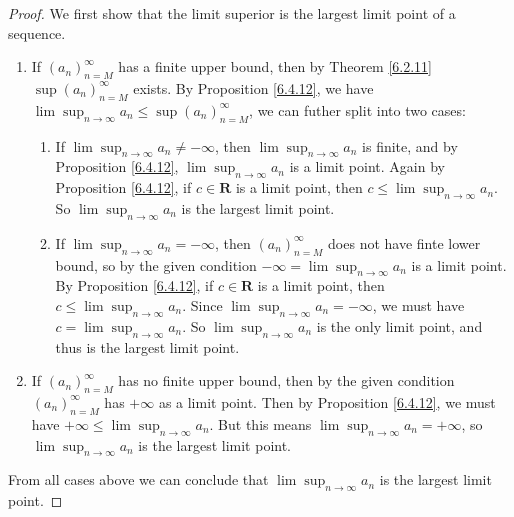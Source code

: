 \begin{proof}
We first show that the limit superior is the largest limit point of a sequence.
\begin{enumerate}
    \item If \((a_n)_{n = M}^\infty\) has a finite upper bound, then by Theorem \ref{6.2.11} \(\sup(a_n)_{n = M}^\infty\) exists.
    By Proposition \ref{6.4.12}, we have \(\lim\sup_{n \to \infty} a_n \leq \sup(a_n)_{n = M}^\infty\), we can futher split into two cases:
    \begin{enumerate}[label=(\Roman*)]
        \item If \(\lim\sup_{n \to \infty} a_n \neq -\infty\), then \(\lim\sup_{n \to \infty} a_n\) is finite, and by Proposition \ref{6.4.12}, \(\lim\sup_{n \to \infty} a_n\) is a limit point.
        Again by Proposition \ref{6.4.12}, if \(c \in \mathbf{R}\) is a limit point, then \(c \leq \lim\sup_{n \to \infty} a_n\).
        So \(\lim\sup_{n \to \infty} a_n\) is the largest limit point.
        \item If \(\lim\sup_{n \to \infty} a_n = -\infty\), then \((a_n)_{n = M}^\infty\) does not have finte lower bound, so by the given condition \(-\infty = \lim\sup_{n \to \infty} a_n\) is a limit point.
        By Proposition \ref{6.4.12}, if \(c \in \mathbf{R}\) is a limit point, then \(c \leq \lim\sup_{n \to \infty} a_n\).
        Since \(\lim\sup_{n \to \infty} a_n = -\infty\), we must have \(c = \lim\sup_{n \to \infty} a_n\).
        So \(\lim\sup_{n \to \infty} a_n\) is the only limit point, and thus is the largest limit point.
    \end{enumerate}
   \item If \((a_n)_{n = M}^\infty\) has no finite upper bound, then by the given condition \((a_n)_{n = M}^\infty\) has \(+\infty\) as a limit point.
    Then by Proposition \ref{6.4.12}, we must have \(+\infty \leq \lim\sup_{n \to \infty} a_n\).
    But this means \(\lim\sup_{n \to \infty} a_n = +\infty\), so \(\lim\sup_{n \to \infty} a_n\) is the largest limit point.
\end{enumerate}
From all cases above we can conclude that \(\lim\sup_{n \to \infty} a_n\) is the largest limit point.


\end{proof}
